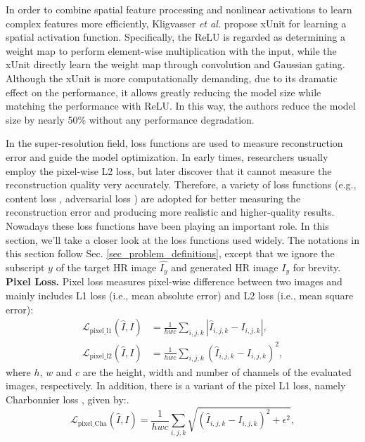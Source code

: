 {\label{sec_xunit}
In order to combine spatial feature processing and nonlinear activations to learn complex features more efficiently, Kligvasser \textit{et al.}  propose xUnit for learning a spatial activation function.
Specifically, the ReLU is regarded as determining a weight map to perform element-wise multiplication with the input, while the xUnit directly learn the weight map through convolution and Gaussian gating.
Although the xUnit is more computationally demanding, due to its dramatic effect on the performance, it allows greatly reducing the model size while matching the performance with ReLU.
In this way, the authors reduce the model size by nearly 50\% without any performance degradation.

\label{sec_learning_strategies}

\label{sec_loss}
In the super-resolution field, loss functions are used to measure reconstruction error and guide the model optimization.
In early times, researchers usually employ the pixel-wise L2 loss, but later discover that it cannot measure the reconstruction quality very accurately.
Therefore, a variety of loss functions (e.g., content loss , adversarial loss ) are adopted for better measuring the reconstruction error and producing more realistic and higher-quality results.
Nowadays these loss functions have been playing an important role.
In this section, we'll take a closer look at the loss functions used widely.
The notations in this section follow Sec. \ref{sec_problem_definitions}, except that we ignore the subscript $y$ of the target HR image $\hat{I_y}$ and generated HR image $I_y$ for brevity.
\textbf{Pixel Loss.}
Pixel loss measures pixel-wise difference between two images and mainly includes L1 loss (i.e., mean absolute error) and L2 loss (i.e., mean square error):
\begin{align}
    \mathcal{L}_{\text{pixel\_l1}} (\hat{I}, I) &= \frac{1}{hwc} \sum_{i,j,k} |\hat{I}_{i,j,k} - I_{i,j,k}| , \\
    \mathcal{L}_{\text{pixel\_l2}} (\hat{I}, I) &= \frac{1}{hwc} \sum_{i,j,k} (\hat{I}_{i,j,k} - I_{i,j,k})^2 ,
\end{align}
where $h$, $w$ and $c$ are the height, width and number of channels of the evaluated images, respectively.
In addition, there is a variant of the pixel L1 loss, namely Charbonnier loss , given by:.
\begin{equation}
    \mathcal{L}_{\text{pixel\_Cha}} (\hat{I}, I) = \frac{1}{hwc} \sum_{i,j,k} \sqrt{(\hat{I}_{i,j,k} - I_{i,j,k})^2 + \epsilon^2} ,
\end{equation}
}
